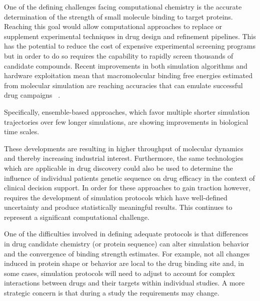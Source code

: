 One of the defining challenges facing computational chemistry is the accurate 
determination of the strength of small molecule binding to target proteins.
Reaching this goal would allow computational approaches to replace or supplement
experimental techniques in drug design and refinement pipelines.
This has the potential to reduce the cost of expensive experimental screening 
programs but in order to do so requires the capability to rapidly screen 
thousands of candidate compounds. 
Recent improvements in both simulation algorithms and hardware exploitation 
mean that macromolecular binding free energies estimated from molecular simulation 
are reaching accuracies that can emulate successful drug campaigns 
~\cite{DeVivo2016}. 

Specifically, ensemble-based approaches, which favor multiple shorter simulation 
trajectories over few longer simulations, are showing improvements in biological 
time scales. 


These developments are resulting in higher throughput of molecular dynamics and
thereby increasing industrial interest.
Furthermore, the same technologies which are applicable in drug discovery 
could also be used to determine the influence of individual patients genetic 
sequence on drug efficacy in the context of clinical decision support.
In order for these approaches to gain traction however, requires the development 
of simulation protocols which have well-defined uncertainty and 
produce statistically meaningful results.
This continues to represent a significant computational challenge. 

One of the difficulties involved in defining adequate protocols is that 
differences in drug candidate chemistry (or protein sequence) can alter 
simulation behavior and the convergence of binding strength estimates.
For example, not all changes induced in protein shape or behavior are local 
to the drug binding site and, in some cases, simulation protocols will need to 
adjust to account for complex interactions between drugs and their targets 
within individual studies.
A more strategic concern is that during a study the requirements may change. 

